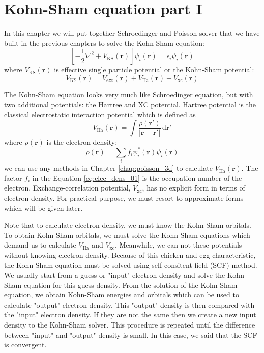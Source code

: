 \chapter{Kohn-Sham equation part I}

In this chapter we will put together Schroedinger and Poisson solver
that we have built in the previous chapters to solve the Kohn-Sham equation:
\begin{equation}
\left[ -\frac{1}{2}\nabla^2 + V_{\mathrm{KS}}(\mathbf{r}) \right]
\psi_{i}(\mathbf{r}) = \epsilon_{i} \psi_{i}(\mathbf{r})
\end{equation}
where $V_{\mathrm{KS}}(\mathbf{r})$ is effective single particle potential or
the Kohn-Sham potential:
\begin{equation}
V_{\mathrm{KS}}(\mathbf{r}) =
V_{\mathrm{ext}}(\mathbf{r}) + V_{\mathrm{Ha}}(\mathbf{r}) + V_{\mathrm{xc}}(\mathbf{r})
\label{eq:KS_pot_local}
\end{equation}

The Kohn-Sham equation looks very much like Schroedinger equation,
but with two additional potentials: the Hartree and XC potential.
Hartree potential is the classical electrostatic interaction potential which is defined as
\begin{equation}
V_{\mathrm{Ha}}(\mathbf{r}) = \int \frac{\rho(\mathbf{r}')}{\left| \mathbf{r} - \mathbf{r}' \right|}
\,\mathrm{d}\mathbf{r}'
\end{equation}
where $\rho(\mathbf{r})$ is the electron density:
\begin{equation}
\rho(\mathbf{r}) = \sum_{i} f_{i} \psi_{i}^{*}(\mathbf{r}) \psi_{i}(\mathbf{r})
\label{eq:elec_dens_01}
\end{equation}
we can use any methods in Chapter \ref{chap:poisson_3d} to calculate
$V_{\mathrm{Ha}}(\mathbf{r})$. The factor $f_{i}$ in the Equation \ref{eq:elec_dens_01}
is the occupation number of the electron.
Exchange-correlation potential, $V_{\mathrm{xc}}$, has no explicit form in terms of
electron density. For practical purpose, we must resort to approximate forms which
will be given later.

Note that to calculate electron density, we must know the Kohn-Sham orbitals.
To obtain Kohn-Sham orbitals, we must solve the Kohn-Sham equations which
demand us to calculate $V_{\mathrm{Ha}}$ and $V_{\mathrm{xc}}$. Meanwhile,
we can not these potentials without knowing electron density.
Because of this chicken-and-egg
characteristic, the Kohn-Sham equation must be solved using self-consitent field (SCF) method.
We usually start from a guess or "input" electron density and solve the Kohn-Sham equation
for this guess density. From the solution of the Kohn-Sham equation, we obtain
Kohn-Sham energies and orbitals which can be used to calculate "output" electron density.
This "output" density is then compared with the "input" electron density. If they are
not the same then we create a new input density to the Kohn-Sham solver. This procedure
is repeated until the difference between "input" and "output" density is small.
In this case, we said that the SCF is convergent.


